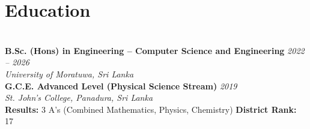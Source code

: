 
\section*{Education}
\BigDivider
\noindent\\
\textbf{B.Sc. (Hons) in Engineering – Computer Science and Engineering}
\hfill \textit{2022 -- 2026}\\
\textit{University of Moratuwa, Sri Lanka}\\[0.15em]

\noindent
\textbf{G.C.E. Advanced Level (Physical Science Stream)} \hfill \textit{2019}\\
\textit{St. John’s College, Panadura, Sri Lanka}\\[0.1em]
\small
\textbf{Results:} 3 A's (Combined Mathematics, Physics, Chemistry) \hfill \textbf{District Rank:} 17
\normalsize
